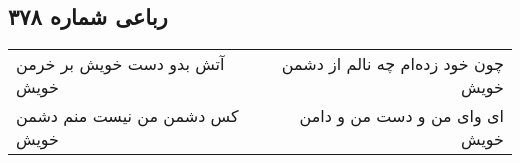 \begin{center}
\section*{رباعی شماره ۳۷۸}
\label{sec:sh378}
\begin{longtable}{l p{0.5cm} r}
آتش بدو دست خویش بر خرمن خویش
&&
چون خود زده‌ام چه نالم از دشمن خویش
\\
کس دشمن من نیست منم دشمن خویش
&&
ای وای من و دست من و دامن خویش
\\
\end{longtable}
\end{center}
